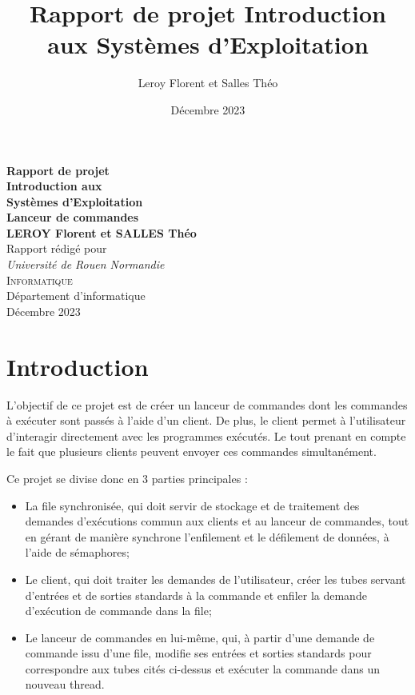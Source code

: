 \documentclass[12pt]{article}
\title{Rapport de projet Introduction aux Systèmes d'Exploitation}
\author{Leroy Florent et Salles Théo}
\date{Décembre 2023}
\begin{document}
    \begin{titlepage}
        \begin{center}
        {\large\bfseries Rapport de projet \\[1ex]}
        {\huge\bfseries Introduction aux \\[0.25ex] Systèmes d'Exploitation \\[2ex]}
        {\LARGE\bfseries Lanceur de commandes \\[6.5ex]}
        {\large\bfseries LEROY Florent et SALLES Théo \\}
            \vspace{4ex}
            Rapport rédigé pour\\[5pt]
            \textit{Université de Rouen Normandie}\\[2cm]
            \textsc{\large Informatique}\\[12ex]
            \vfill
            Département d'informatique\\
            \vfill
            Décembre 2023
        \end{center}
    \end{titlepage}
    \newpage
    \tableofcontents
    \newpage


    \section{Introduction}
    L'objectif de ce projet est de créer un lanceur de commandes dont les commandes à exécuter sont passés à l'aide d'un client. De plus, le client permet à l'utilisateur d'interagir directement avec les programmes exécutés. Le tout prenant en compte le fait que plusieurs clients peuvent envoyer ces commandes simultanément.

    Ce projet se divise donc en 3 parties principales :
    \begin{itemize}
        \item La file synchronisée, qui doit servir de stockage et de traitement des demandes d'exécutions commun aux clients et au lanceur de commandes, tout en gérant de manière synchrone l'enfilement et le défilement de données, à l'aide de sémaphores;
        \item Le client, qui doit traiter les demandes de l'utilisateur, créer les tubes servant d'entrées et de sorties standards à la commande et enfiler la demande d'exécution de commande dans la file;
        \item Le lanceur de commandes en lui-même, qui, à partir d'une demande de commande issu d'une file, modifie ses entrées et sorties standards pour correspondre aux tubes cités ci-dessus et exécuter la commande dans un nouveau thread.
    \end{itemize}
\end{document}
